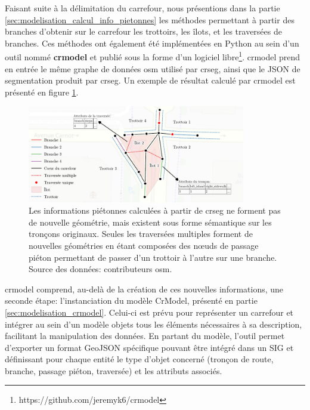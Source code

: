\newpar{}

Faisant suite à la délimitation du carrefour, nous présentions dans la partie \ref{sec:modelisation_calcul_info_pietonnes} les méthodes permettant à partir des branches d'obtenir sur le carrefour les trottoirs, les îlots, et les traversées de branches. Ces méthodes ont également été implémentées en Python au sein d'un outil nommé \textbf{crmodel} et publié sous la forme d'un logiciel libre\footnote{https://github.com/jeremyk6/crmodel}. crmodel prend en entrée le même graphe de données \gls{osm} utilisé par crseg, ainsi que le JSON de segmentation produit par crseg. Un exemple de résultat calculé par crmodel est présenté en figure \ref{fig:experimentation_crmodel_info_pietonne}.

\begin{figure}[ht]
    \centering
    \includegraphics[width=0.85\textwidth]{images/experimentation/donnees_crmodel.pdf}
    \caption[Données produites par crmodel]{Les informations piétonnes calculées à partir de crseg ne forment pas de nouvelle géométrie, mais existent sous forme sémantique sur les tronçons originaux. Seules les traversées multiples forment de nouvelles géométries en étant composées des nœuds de passage piéton permettant de passer d'un trottoir à l'autre sur une branche. Source des données: contributeurs \gls{osm}.}
    \label{fig:experimentation_crmodel_info_pietonne}
\end{figure}

\newpar{}

crmodel comprend, au-delà de la création de ces nouvelles informations, une seconde étape: l'instanciation du modèle CrModel, présenté en partie \ref{sec:modelisation_crmodel}. Celui-ci est prévu pour représenter un carrefour et intégrer au sein d'un modèle objets tous les éléments nécessaires à sa description, facilitant la manipulation des données. En partant du modèle, l'outil permet d'exporter un format GeoJSON spécifique pouvant être intégré dans un SIG et définissant pour chaque entité le type d'objet concerné (tronçon de route, branche, passage piéton, traversée) et les attributs associés.

